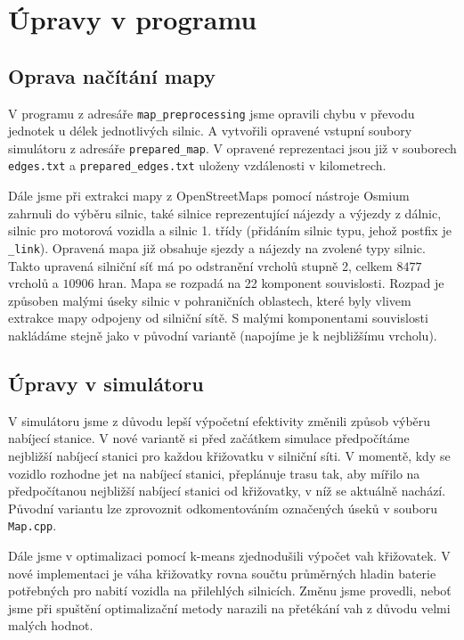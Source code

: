 \chapter{Úpravy v programu}

\section{Oprava načítání mapy}
V programu z adresáře \texttt{map\_preprocessing} jsme opravili chybu v převodu
jednotek u délek jednotlivých silnic. A vytvořili opravené vstupní soubory simulátoru 
z adresáře \texttt{prepared\_map}. V opravené reprezentaci jsou již v souborech 
\texttt{edges.txt} a \texttt{prepared\_edges.txt} uloženy vzdálenosti v kilometrech.

Dále jsme při extrakci mapy z OpenStreetMaps pomocí nástroje Osmium zahrnuli do 
výběru silnic, také silnice reprezentující nájezdy a výjezdy z dálnic, silnic pro
motorová vozidla a silnic 1. třídy (přidáním silnic typu, jehož postfix je \texttt{\_link}).
Opravená mapa již obsahuje sjezdy a nájezdy na zvolené typy silnic.
Takto upravená silniční síť má po odstranění vrcholů stupně 2, celkem $8477$ vrcholů a 
$10906$ hran. Mapa se rozpadá na 22 komponent souvislosti. Rozpad je způsoben malými úseky 
silnic v pohraničních oblastech, které byly vlivem extrakce mapy odpojeny od silniční sítě.
S malými komponentami souvislosti nakládáme stejně jako v původní variantě 
(napojíme je k nejbližšímu vrcholu).

\section{Úpravy v simulátoru}
\label{sec:upravy}
V simulátoru jsme z důvodu lepší výpočetní efektivity změnili způsob výběru nabíjecí stanice.
V nové variantě si před začátkem simulace předpočítáme nejbližší nabíjecí stanici pro
každou křižovatku v silniční síti. V momentě, kdy se vozidlo rozhodne jet na nabíjecí stanici,
přeplánuje trasu tak, aby mířilo na předpočítanou nejbližší nabíjecí stanici od křižovatky, 
v níž se aktuálně nachází. Původní variantu lze zprovoznit odkomentováním označených úseků
v souboru \texttt{Map.cpp}.

Dále jsme v optimalizaci pomocí k-means zjednodušili výpočet vah křižovatek. V nové 
implementaci je váha křižovatky rovna součtu průměrných hladin baterie potřebných pro nabití vozidla
na přilehlých silnicích. Změnu jsme provedli, neboť jsme při spuštění optimalizační metody
narazili na přetékání vah z důvodu velmi malých hodnot.

